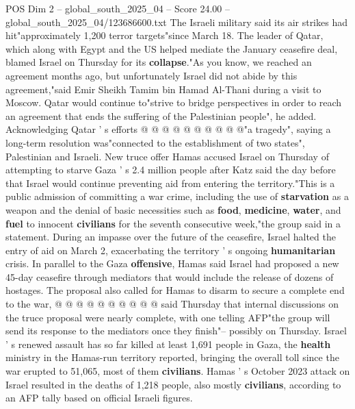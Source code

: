 \begin{textsample}{POS Dim 2 – global\_south\_2025\_04 – Score 24.00 – global\_south\_2025\_04/123686600.txt}
The Israeli military said its air strikes had hit"approximately 1,200 terror targets"since March 18.
The leader of Qatar, which along with Egypt and the US helped mediate the January ceasefire deal, blamed Israel on Thursday for its \textbf{collapse}."As you know, we reached an agreement months ago, but unfortunately Israel did not abide by this agreement,"said Emir Sheikh Tamim bin Hamad Al-Thani during a visit to Moscow.
Qatar would continue to"strive to bridge perspectives in order to reach an agreement that ends the suffering of the Palestinian people", he added.
Acknowledging Qatar ' s efforts @ @ @ @ @ @ @ @ @ @"a tragedy", saying a long-term resolution was"connected to the establishment of two states", Palestinian and Israeli.
New truce offer Hamas accused Israel on Thursday of attempting to starve Gaza ' s 2.4 million people after Katz said the day before that Israel would continue preventing aid from entering the territory."This is a public admission of committing a war crime, including the use of \textbf{starvation} as a weapon and the denial of basic necessities such as \textbf{food}, \textbf{medicine}, \textbf{water}, and \textbf{fuel} to innocent \textbf{civilians} for the seventh consecutive week,"the group said in a statement.
During an impasse over the future of the ceasefire, Israel halted the entry of aid on March 2, exacerbating the territory ' s ongoing \textbf{humanitarian} crisis.
In parallel to the Gaza \textbf{offensive}, Hamas said Israel had proposed a new 45-day ceasefire through mediators that would include the release of dozens of hostages.
The proposal also called for Hamas to disarm to secure a complete end to the war, @ @ @ @ @ @ @ @ @ @ said Thursday that internal discussions on the truce proposal were nearly complete, with one telling AFP"the group will send its response to the mediators once they finish"-- possibly on Thursday.
Israel ' s renewed assault has so far killed at least 1,691 people in Gaza, the \textbf{health} ministry in the Hamas-run territory reported, bringing the overall toll since the war erupted to 51,065, most of them \textbf{civilians}.
Hamas ' s October 2023 attack on Israel resulted in the deaths of 1,218 people, also mostly \textbf{civilians}, according to an AFP tally based on official Israeli figures.

\end{textsample}
